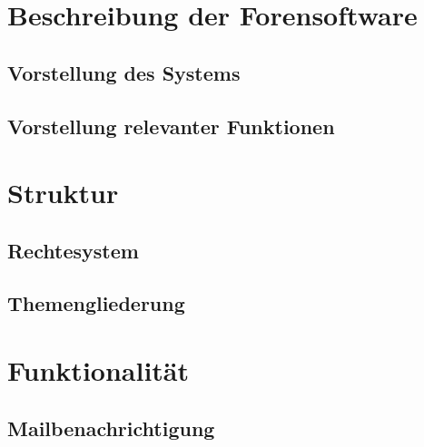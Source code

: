 \label{sec:hauptteil}

\section{Beschreibung der Forensoftware} %
\label{sec:beschreibung_der_forensoftware}

\subsection{Vorstellung des Systems} %
\label{sub:vorstellung_des_systems}


\subsection{Vorstellung relevanter Funktionen} %
\label{sub:vorstellung_relevanter_funktionen}



\section{Struktur} %
\label{sec:struktur}

\subsection{Rechtesystem} %
\label{sub:rechtesystem}


\subsection{Themengliederung} %
\label{sub:themengliederung}



\section{Funktionalität} %
\label{sec:funktionalitat}

\subsection{Mailbenachrichtigung} %
\label{sub:mailbenachrichtigung}

